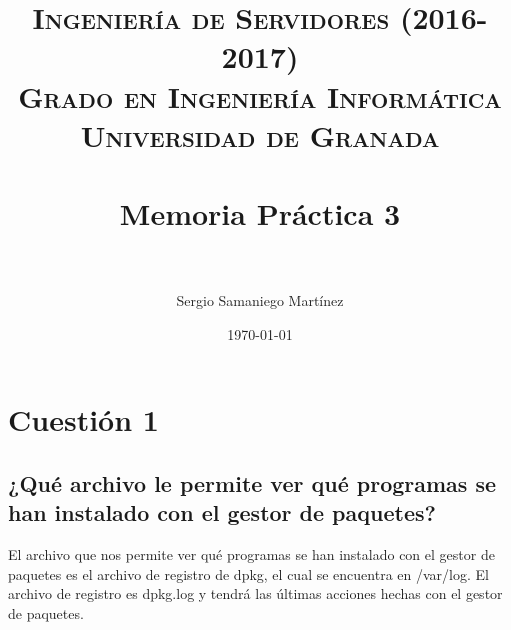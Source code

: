 


\title{	
\normalfont \normalsize 
\textsc{\textbf{Ingeniería de Servidores (2016-2017)} \\ Grado en Ingeniería Informática \\ Universidad de Granada} \\ [25pt] %
\horrule{0.5pt} \\[0.4cm] %
\huge Memoria Práctica 3 \\ %
\horrule{2pt} \\[0.5cm] %
}

\author{Sergio Samaniego Martínez} %

\date{\normalsize\today} %




\maketitle %

\newpage %

\tableofcontents %

\newpage

\section{Cuestión 1}

\subsection{\Large¿Qué archivo le permite ver qué programas se han instalado con el gestor de paquetes? }

El archivo que nos permite ver qué programas se han instalado con el gestor de paquetes es el archivo de registro de dpkg, el cual se encuentra en /var/log.
El archivo de registro es dpkg.log y tendrá las últimas acciones hechas con el gestor de paquetes. \cite{dpkg}

